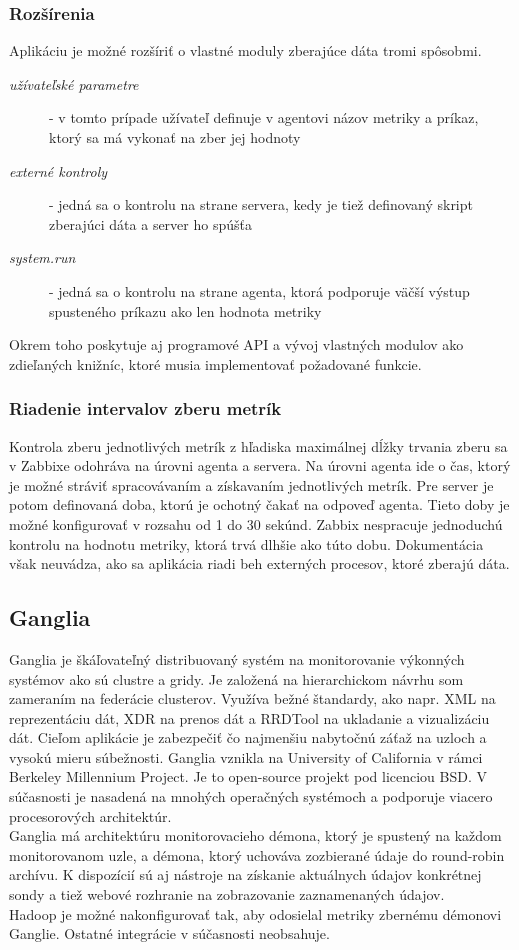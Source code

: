\documentclass[printed,11pt,twoside,color,cover,table]{fithesis3}
\begin{document}
\subsubsection{Rozšírenia}
Aplikáciu je možné rozšíriť o vlastné moduly zberajúce dáta tromi spôsobmi. 
\begin{description}
\item[\emph{užívateľské parametre}] - v tomto prípade užívateľ definuje v agentovi názov metriky a príkaz, ktorý sa má vykonať na zber jej hodnoty
\item[\emph{externé kontroly}] - jedná sa o kontrolu na strane servera, kedy je tiež definovaný skript zberajúci dáta a server ho spúšťa
\item[\emph{system.run}] - jedná sa o kontrolu na strane agenta, ktorá podporuje väčší výstup spusteného príkazu ako len hodnota metriky
\end{description}
\cite{zabbix-modules}
Okrem toho poskytuje aj programové API a vývoj vlastných modulov ako zdieľaných knižníc, ktoré musia implementovať požadované funkcie.

\subsubsection{Riadenie intervalov zberu metrík}
Kontrola zberu jednotlivých metrík z hľadiska maximálnej dĺžky trvania zberu sa v Zabbixe odohráva na úrovni agenta a servera. Na úrovni agenta ide o čas, ktorý je možné stráviť spracovávaním a získavaním
jednotlivých metrík. Pre server je potom definovaná doba, ktorú je ochotný čakať na odpoveď agenta. Tieto doby je možné konfigurovať v rozsahu od 1 do 30 sekúnd.\cite{zabbix-server}
Zabbix nespracuje jednoduchú kontrolu na hodnotu metriky, ktorá trvá dlhšie ako túto dobu.\cite{zabbix-limit}
Dokumentácia však neuvádza, ako sa aplikácia riadi beh externých procesov, ktoré zberajú dáta.

\subsection{Ganglia} 
Ganglia je škáľovateľný distribuovaný systém na monitorovanie výkonných systémov ako sú clustre a gridy. Je založená na hierarchickom návrhu 
som zameraním na federácie clusterov. Využíva bežné štandardy, ako napr. XML na reprezentáciu dát, XDR na prenos dát a RRDTool na
ukladanie a vizualizáciu dát.\cite{ganglia} 
Cieľom aplikácie je zabezpečiť čo najmenšiu nabytočnú záťaž na uzloch a vysokú
mieru súbežnosti. Ganglia vznikla na University of California v rámci Berkeley Millennium Project. Je to open-source projekt
pod licenciou BSD. V súčasnosti je nasadená na mnohých operačných systémoch a podporuje viacero procesorových architektúr.
\\Ganglia má architektúru monitorovacieho démona, ktorý je spustený na každom monitorovanom uzle, a démona, ktorý uchováva zozbierané údaje do
round-robin archívu.
K dispozícií sú aj nástroje na získanie aktuálnych údajov konkrétnej sondy a tiež webové rozhranie na zobrazovanie zaznamenaných údajov.
\\Hadoop je možné nakonfigurovať tak, aby odosielal metriky zbernému démonovi Ganglie. Ostatné integrácie v súčasnosti neobsahuje.
\end{document}
